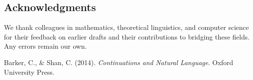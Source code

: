 \documentclass[12pt]{article}
\theoremstyle{plain}
\theoremstyle{definition}
\begin{document}
\subsection*{Acknowledgments}
We thank colleagues in mathematics, theoretical linguistics, and computer science for their feedback on earlier drafts and their contributions to bridging these fields. Any errors remain our own.

\begin{thebibliography}{99}

Barker, C., \& Shan, C. (2014). \textit{Continuations and Natural Language}. Oxford University Press.

\end{thebibliography}
\end{document}
